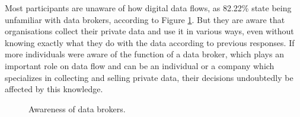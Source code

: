 

Most participants are unaware of how digital data flows, as 82.22\% state
being unfamiliar with data brokers, according to Figure \ref{fig:aware_data_brokers}.
But they are aware that organisations collect their private data and use it
in various ways, even without knowing exactly what they do with the data
according to previous responses. If more individuals were aware of the function
of a data broker, which plays an important role on data flow and can be an individual
or a company which specializes in collecting and selling private data, their decisions
undoubtedly be affected by this knowledge.

\begin{figure}[H]
    \centering
    \caption{Awareness of data brokers.}
    \label{fig:aware_data_brokers}
\end{figure}

